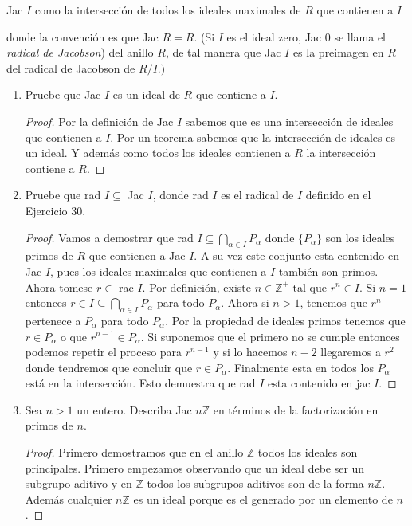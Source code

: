 \documentclass[letter,twoside,12pt]{article}
\begin{document}
\begin{center}
Jac $I$ como la intersecci\'on de todos los ideales maximales de $R$ que contienen a $I$
\end{center}

donde la convenci\'on es que Jac $R=R$. (Si $I$ es el ideal zero, Jac 0 se llama el \textit{radical de Jacobson}) del anillo $R$, de tal manera que Jac $I$ es la preimagen en $R$ del radical de Jacobson de $R/I.)$

\begin{enumerate}[label=\textbf{(\alph*)}]
\item Pruebe que Jac $I$ es un ideal de $R$ que contiene a $I$.
\begin{proof}
Por la definici\'on de Jac $I$ sabemos que es una intersecci\'on de ideales que contienen a $I$. Por un teorema sabemos que la intersecci\'on de ideales es un ideal. Y adem\'as como todos los ideales contienen a $R$ la intersecci\'on contiene a $R$.
\end{proof}
\item Pruebe que rad $I \subseteq$ Jac $I$, donde rad $I$ es el radical de $I$ definido en el Ejercicio 30.
\begin{proof}
Vamos a demostrar que rad $I \subseteq \bigcap_{\alpha \in I} P_{\alpha}$ donde $\{P_{\alpha}\}$ son los ideales primos de $R$ que contienen a Jac $I$. A su vez este conjunto esta contenido en Jac $I$, pues los ideales maximales que contienen a $I$ tambi\'en son primos. Ahora tomese $r\in$ rac $I$. Por definici\'on, existe $n \in \mathbb{Z}^+$ tal que $r^n \in I$. Si $n=1$ entonces $r \in I \subseteq \bigcap_{\alpha \in I} P_\alpha$ para todo $P_\alpha$. Ahora si $n>1$, tenemos que $r^n$ pertenece a $P_\alpha$ para todo $P_\alpha$. Por la propiedad de ideales primos tenemos que $r \in P_{\alpha}$ o que $r^{n-1} \in P_{\alpha}$. Si suponemos que el primero no se cumple entonces podemos repetir el proceso para $r^{n-1}$ y si lo hacemos $n-2$ llegaremos a $r^2$ donde tendremos que concluir que $r \in P_{\alpha}$. Finalmente esta en todos los $P_{\alpha}$ est\'a en la intersecci\'on. Esto demuestra que rad $I$ esta contenido en jac $I$.
\end{proof}

\item Sea $n>1$ un entero. Describa Jac $n\mathbb{Z}$ en t\'erminos de la factorizaci\'on en primos de $n$.
\begin{proof}
Primero demostramos que en el anillo $\mathbb{Z}$ todos los ideales son principales. Primero empezamos observando que un ideal debe ser un subgrupo aditivo y en $\mathbb{Z}$ todos los subgrupos aditivos son de la forma $n\mathbb{Z}$. Adem\'as cualquier $n\mathbb{Z}$ es un ideal porque es el generado por un elemento de $n$.


\end{proof}
\end{enumerate}
\end{document}

